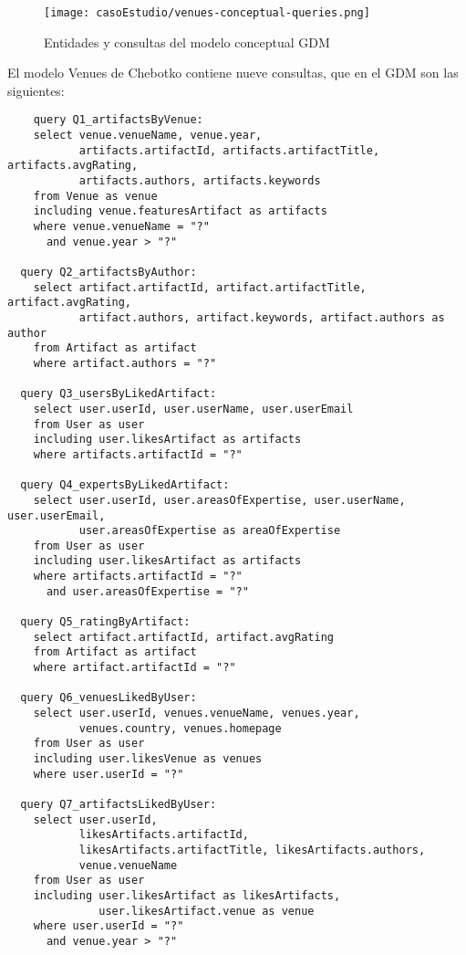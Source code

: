 \begin{figure}[H]
    \centering
    \texttt{[image: casoEstudio/venues-conceptual-queries.png]}
    \caption{Entidades y consultas del modelo conceptual GDM}
    \label{img:venues-conceptual-queries}
\end{figure}

El modelo Venues de  Chebotko contiene nueve consultas, que en el GDM son las siguientes:

\begin{verbatim}
    query Q1_artifactsByVenue:
    select venue.venueName, venue.year,
           artifacts.artifactId, artifacts.artifactTitle, artifacts.avgRating,
           artifacts.authors, artifacts.keywords
    from Venue as venue
    including venue.featuresArtifact as artifacts
    where venue.venueName = "?"
      and venue.year > "?"
  
  query Q2_artifactsByAuthor:
    select artifact.artifactId, artifact.artifactTitle, artifact.avgRating,
           artifact.authors, artifact.keywords, artifact.authors as author
    from Artifact as artifact
    where artifact.authors = "?"
  
  query Q3_usersByLikedArtifact:
    select user.userId, user.userName, user.userEmail
    from User as user
    including user.likesArtifact as artifacts
    where artifacts.artifactId = "?"
  
  query Q4_expertsByLikedArtifact:
    select user.userId, user.areasOfExpertise, user.userName, user.userEmail,
           user.areasOfExpertise as areaOfExpertise
    from User as user
    including user.likesArtifact as artifacts
    where artifacts.artifactId = "?"
      and user.areasOfExpertise = "?"
  
  query Q5_ratingByArtifact:
    select artifact.artifactId, artifact.avgRating
    from Artifact as artifact
    where artifact.artifactId = "?"
  
  query Q6_venuesLikedByUser:
    select user.userId, venues.venueName, venues.year,
           venues.country, venues.homepage
    from User as user
    including user.likesVenue as venues
    where user.userId = "?"
  
  query Q7_artifactsLikedByUser:
    select user.userId,
           likesArtifacts.artifactId,
           likesArtifacts.artifactTitle, likesArtifacts.authors,
           venue.venueName
    from User as user
    including user.likesArtifact as likesArtifacts,
              user.likesArtifact.venue as venue
    where user.userId = "?"
      and venue.year > "?"
  

\end{verbatim}

